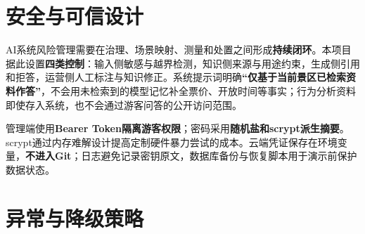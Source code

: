 \section{安全与可信设计}

AI系统风险管理需要在治理、场景映射、测量和处置之间形成\textbf{持续闭环}。本项目据此设置\textbf{四类控制}：输入侧敏感与越界检测，知识侧来源与用途约束，生成侧引用和拒答，运营侧人工标注与知识修正。系统提示词明确\textbf{“仅基于当前景区已检索资料作答”}，不会用未检索到的模型记忆补全票价、开放时间等事实；行为分析资料即使存入系统，也不会通过游客问答的公开访问范围。

管理端使用\textbf{Bearer Token}\textbf{隔离游客权限}；密码采用\textbf{随机盐和scrypt派生摘要}。scrypt通过内存难解设计提高定制硬件暴力尝试的成本。云端凭证保存在环境变量，\textbf{不进入Git}；日志避免记录密钥原文，数据库备份与恢复脚本用于演示前保护数据状态。

\section{异常与降级策略}

